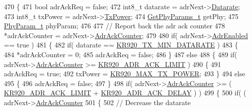 \begin{DoxyCode}
470 \{
471     \textcolor{keywordtype}{bool} adrAckReq = \textcolor{keyword}{false};
472     int8\_t datarate = adrNext->\mbox{\hyperlink{structs_adr_next_params_ae2f6080f3aa0e9485c55513ca56bb24d}{Datarate}};
473     int8\_t txPower = adrNext->\mbox{\hyperlink{structs_adr_next_params_a037b4f849fa8ed4aa1d3c58aef2b28ec}{TxPower}};
474     \mbox{\hyperlink{structs_get_phy_params}{GetPhyParams\_t}} getPhy;
475     \mbox{\hyperlink{unionu_phy_param}{PhyParam\_t}} phyParam;
476 
477     \textcolor{comment}{// Report back the adr ack counter}
478     *adrAckCounter = adrNext->\mbox{\hyperlink{structs_adr_next_params_a24f0356a3491bf07be9ac99ffa33896a}{AdrAckCounter}};
479 
480     \textcolor{keywordflow}{if}( adrNext->\mbox{\hyperlink{structs_adr_next_params_ab3e2fb44577c95786e11aacd56769703}{AdrEnabled}} == \textcolor{keyword}{true} )
481     \{
482         \textcolor{keywordflow}{if}( datarate == \mbox{\hyperlink{group___r_e_g_i_o_n_k_r920_ga9eff66e6e0242d6a7563dd346a56e3ab}{KR920\_TX\_MIN\_DATARATE}} )
483         \{
484             *adrAckCounter = 0;
485             adrAckReq = \textcolor{keyword}{false};
486         \}
487         \textcolor{keywordflow}{else}
488         \{
489             \textcolor{keywordflow}{if}( adrNext->\mbox{\hyperlink{structs_adr_next_params_a24f0356a3491bf07be9ac99ffa33896a}{AdrAckCounter}} >= \mbox{\hyperlink{group___r_e_g_i_o_n_k_r920_ga6950b0a2c12046467e541efc0738c58c}{KR920\_ADR\_ACK\_LIMIT}} )
490             \{
491                 adrAckReq = \textcolor{keyword}{true};
492                 txPower = \mbox{\hyperlink{group___r_e_g_i_o_n_k_r920_ga83f7aad24311983622b179a74c3c80d0}{KR920\_MAX\_TX\_POWER}};
493             \}
494             \textcolor{keywordflow}{else}
495             \{
496                 adrAckReq = \textcolor{keyword}{false};
497             \}
498             \textcolor{keywordflow}{if}( adrNext->\mbox{\hyperlink{structs_adr_next_params_a24f0356a3491bf07be9ac99ffa33896a}{AdrAckCounter}} >= ( \mbox{\hyperlink{group___r_e_g_i_o_n_k_r920_ga6950b0a2c12046467e541efc0738c58c}{KR920\_ADR\_ACK\_LIMIT}} + 
      \mbox{\hyperlink{group___r_e_g_i_o_n_k_r920_gad06060e2fefe5ba46e3015555759a088}{KR920\_ADR\_ACK\_DELAY}} ) )
499             \{
500                 \textcolor{keywordflow}{if}( ( adrNext->\mbox{\hyperlink{structs_adr_next_params_a24f0356a3491bf07be9ac99ffa33896a}{AdrAckCounter}} %
501                 \{
502                     \textcolor{comment}{// Decrease the datarate}

\end{DoxyCode}
